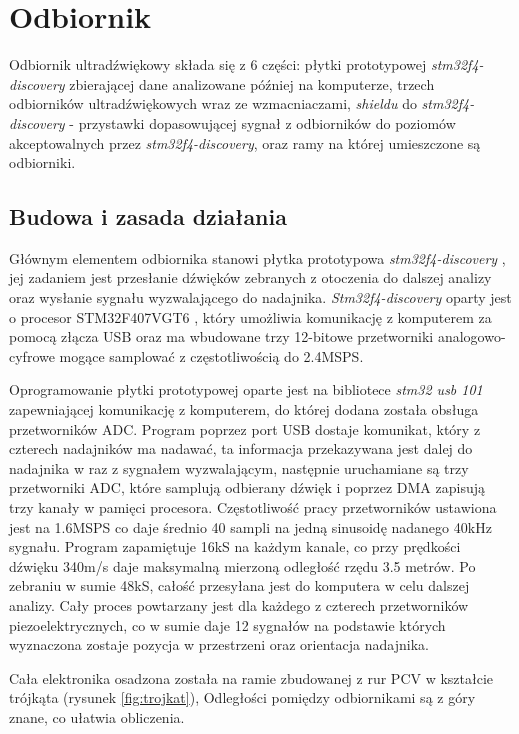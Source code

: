 \chapter{Odbiornik}

Odbiornik ultradźwiękowy składa się z 6 części:
płytki prototypowej \textit{stm32f4-discovery} zbierającej dane analizowane później na komputerze,
 trzech odbiorników ultradźwiękowych wraz ze wzmacniaczami, 
 \textit{shieldu} do \textit{stm32f4-discovery} - przystawki dopasowującej sygnał z odbiorników do poziomów akceptowalnych przez
\textit{stm32f4-discovery}, oraz ramy na której umieszczone są odbiorniki.

\section{Budowa i zasada działania}

Głównym elementem odbiornika stanowi płytka prototypowa \textit{stm32f4-discovery} \cite{bib:stm32f4Discovery},
jej zadaniem jest przesłanie dźwięków zebranych z otoczenia do dalszej analizy oraz wysłanie sygnału wyzwalającego 
do nadajnika.
\textit{Stm32f4-discovery} oparty jest o procesor STM32F407VGT6 \cite{bib:stm32f407}, który 
umożliwia komunikację z komputerem za pomocą złącza USB oraz ma wbudowane trzy 12-bitowe przetworniki analogowo-cyfrowe
mogące samplować z częstotliwością do 2.4MSPS. 


Oprogramowanie płytki prototypowej oparte jest na bibliotece \textit{stm32 usb 101} \cite{bib:stm32_usb_101}
zapewniającej komunikację z komputerem, do której dodana została obsługa przetworników ADC.
Program poprzez port USB dostaje komunikat, który z czterech nadajników ma nadawać, ta informacja przekazywana jest
dalej do nadajnika w raz z sygnałem wyzwalającym, następnie uruchamiane są trzy przetworniki ADC, które 
samplują odbierany dźwięk i poprzez DMA zapisują trzy kanały w pamięci procesora.
Częstotliwość pracy przetworników ustawiona jest na 1.6MSPS co daje średnio 40 sampli na jedną sinusoidę nadanego 40kHz sygnału.
Program zapamiętuje 16kS na każdym kanale, co przy prędkości dźwięku 340m/s daje maksymalną mierzoną odległość rzędu 3.5 metrów.
Po zebraniu w sumie 48kS, całość przesyłana jest do komputera w celu dalszej analizy.
Cały proces powtarzany jest dla każdego z czterech przetworników piezoelektrycznych, 
co w sumie daje 12 sygnałów na podstawie których wyznaczona zostaje 
pozycja w przestrzeni oraz orientacja nadajnika.

Cała elektronika osadzona została na ramie zbudowanej z rur PCV w kształcie trójkąta (rysunek \ref{fig:trojkat}), 
Odległości pomiędzy odbiornikami są z góry znane, co ułatwia obliczenia.

